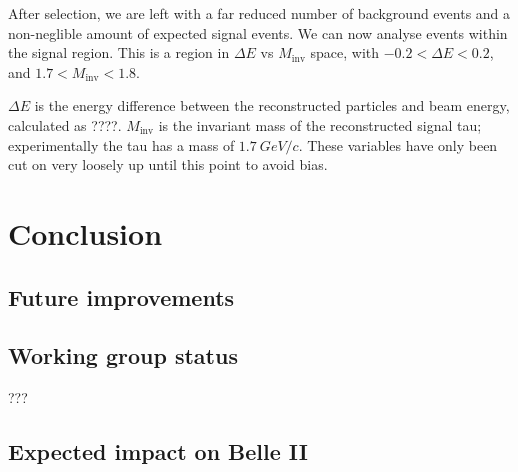 \documentclass[12pt,a4paper]{article} %
\begin{document}
After selection, we are left with a far reduced number of background events and a non-neglible amount of expected signal events. We can now analyse events within the signal region. This is a region in $\Delta E$ vs $M_{\text{inv}}$ space, with $-0.2 < \Delta E < 0.2$, and $1.7 < M_{\text{inv}} < 1.8$.

$\Delta E$ is the energy difference between the reconstructed particles and beam energy, calculated as ????. $M_{\text{inv}}$ is the invariant mass of the reconstructed signal tau; experimentally the tau has a mass of $\SI{1.7}{GeV/c}$. These variables have only been cut on very loosely up until this point to avoid bias.

\pagebreak


\section{Conclusion}

\subsection{Future improvements}

\subsection{Working group status}

???

\subsection{Expected impact on Belle II}





\end{document}
